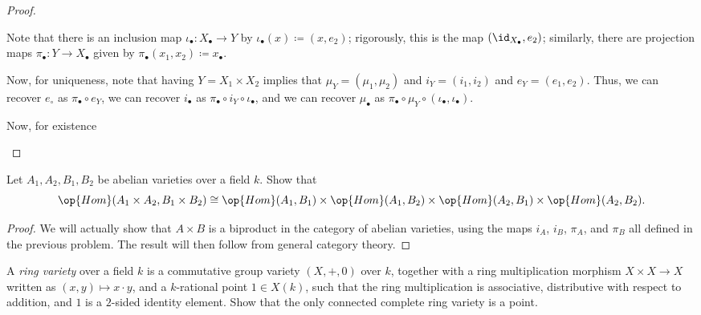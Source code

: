 \documentclass[../notes.tex]{subfiles}
\begin{document}
\begin{proof}
\begin{listalph}
		\item Note that there is an inclusion map $\iota_\bullet\colon X_\bullet\to Y$ by $\iota_\bullet(x)\coloneqq(x,e_2)$; rigorously, this is the map $({\id_{X_\bullet}},e_2)$; similarly, there are projection maps $\pi_\bullet\colon Y\to X_\bullet$ given by $\pi_\bullet(x_1,x_2)\coloneqq x_\bullet$.
		
		Now, for uniqueness, note that having $Y=X_1\times X_2$ implies that $\mu_Y=(\mu_1,\mu_2)$ and $i_Y=(i_1,i_2)$ and $e_Y=(e_1,e_2)$. Thus, we can recover $e_\circ$ as $\pi_\bullet\circ e_Y$, we can recover $i_\bullet$ as $\pi_\bullet\circ i_Y\circ\iota_\bullet$, and we can recover $\mu_\bullet$ as $\pi_\bullet\circ\mu_Y\circ(\iota_\bullet,\iota_\bullet)$.

		Now, for existence
		\[\]
	\end{listalph}
\end{proof}

\begin{prob}
	Let $A_1, A_2, B_1, B_2$ be abelian varieties over a field $k$. Show that 
    \begin{equation*}
        \label{eq:hom-prods}
        \op{Hom}(A_1\times A_2, B_1\times B_2) \cong \op{Hom}(A_1, B_1) \times \op{Hom}(A_1, B_2) \times \op{Hom}(A_2, B_1) \times \op{Hom}(A_2, B_2).
    \end{equation*}
\end{prob}
\begin{proof}
	We will actually show that $A\times B$ is a biproduct in the category of abelian varieties, using the maps $i_A$, $i_B$, $\pi_A$, and $\pi_B$ all defined in the previous problem. The result will then follow from general category theory.
\end{proof}

\begin{prob}
	A \textit{ring variety} over a field $k$ is a commutative group variety $(X, +, 0)$ over $k$, together with a ring multiplication morphism $X \times X \to X$ written as $(x,y) \mapsto x \cdot y$, and a $k$-rational point $1\in X(k)$, such that the ring multiplication is associative, distributive with respect to addition, and $1$ is a $2$-sided identity element. Show that the only connected complete ring variety is a point.
\end{prob}
\end{document}
